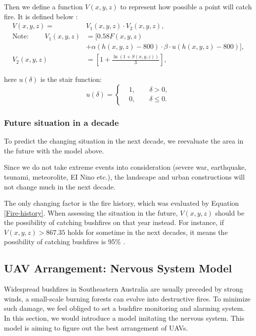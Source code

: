 \documentclass[13pt]{ctexart} %
\begin{document}
Then we define a function $V(x,y,z)$ to represent how possible a point will catch fire. It is defined below :
\begin{equation}\label{PossibilityFire}
    \begin{aligned}
        V(x,y,z) =                     & V_1(x,y,z)\cdot V_2(x,y,z), \\
        \text{Note: }\qquad V_1(x,y,z) & = [
        0.58 F(x,y,z)                                                \\
                                       & +\alpha\left(
        h(x,y,z)-800
        \right)\cdot
        \beta\cdot u(h(x,y,z)-800)
        ],                                                           \\
        V_2(x,y,z)                     & =\left[
            1+\frac{\ln \left(1+S\left(x,y,z\right)\right)}{3}
            \right],
    \end{aligned}
\end{equation}

here $u(\delta)$ is the stair function:
\begin{equation}\label{Stair}%
    u(\delta)=
    \left\{
    \begin{aligned}
         & 1,\qquad \delta> 0,    \\
         & 0,\qquad \delta\leq 0.
    \end{aligned}
    \right.
\end{equation}

\subsubsection{Future situation in a decade}
To predict the changing situation in the next decade, we reevaluate the area in the future with the model above.

Since we do not take extreme events into consideration (severe war, earthquake, tsunami, meteorolite, EI Nino etc.), the landscape and urban constructions will not change much in the next decade.

The only changing factor is the fire history, which was evaluated by Equation \ref{Fire-history}. When assessing the situation in the future, $V(x,y,z)$ should be the possibility of catching bushfires on that year instead. For instance, if $V(x,y,z)>867.35$ holds for sometime in the next decades, it means the possibility of catching bushfires is 95\% .

\subsection{UAV Arrangement: Nervous System Model}
Widespread bushfires in Southeastern Australia are usually preceded by strong winds, a small-scale burning forests can evolve into destructive fires. To minimize such damage, we feel obliged to set a bushfire monitoring and alarming system. In this section, we would introduce a model imitating the nervous system. This model is aiming to figure out the best arrangement of UAVs.
\end{document}
